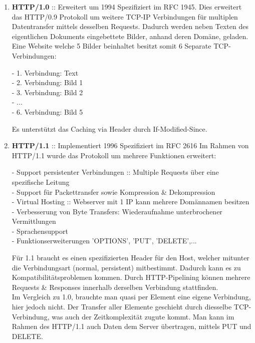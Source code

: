 \documentclass[11pt]{article}
\begin{document}
\begin{enumerate}[\thesection .1]
\begin{enumerate}[$\diamond$]
        \item \textbf{HTTP/1.0} :: Erweitert um 1994
        Spezifiziert im RFC 1945. Dies erweitert das HTTP/0.9 Protokoll um weitere TCP-IP Verbindungen für multiplen Datentransfer mittels desselben Requests.
        Dadurch werden neben Texten des eigentlichen Dokuments eingebettete Bilder, anhand deren Domäne, geladen.\\
        Eine Website welche 5 Bilder beinhaltet besitzt somit 6 Separate TCP-Verbindungen:
        \begin{addmargin}[1em]{1em}
            - 1. Verbindung: Text\\
            - 2. Verbindung: Bild 1\\
            - 3. Verbindung: Bild 2\\
            - ...\\
            - 6. Verbindung: Bild 5
        \end{addmargin}
        Es unterstützt das Caching via Header durch If-Modified-Since.\\

        \item \textbf{HTTP/1.1} :: Implementiert 1996
        Spezifiziert im RFC 2616
        Im Rahmen von HTTP/1.1 wurde das Protokoll um mehrere Funktionen erweitert:
        \begin{addmargin}[1em]{1em}
            - Support persistenter Verbindungen :: Multiple Requests über eine spezifische Leitung\\
            - Support für Packettransfer sowie Kompression \& Dekompression\\
            - Virtual Hosting :: Webserver mit 1 IP kann mehrere Domännamen besitzen\\
            - Verbesserung von Byte Transfers: Wiederaufnahme unterbrochener Vermittlungen\\
            - Sprachensupport\\
            - Funktionserweiterungen 'OPTIONS', 'PUT', 'DELETE',...
        \end{addmargin}
        Für 1.1 braucht es einen spezifizierten Header für den Host, welcher mitunter die Verbindungsart (normal, persistent) mitbestimmt.
        Dadurch kann es zu Kompatibilitätsproblemen kommen. Durch HTTP-Pipelining können mehrere Requests \& Responses innerhalb derselben Verbindung stattfinden.\\
        Im Vergleich zu 1.0, brauchte man quasi per Element eine eigene Verbindung, hier jedoch nicht. Der Transfer aller Elemente geschieht durch diesselbe TCP-Verbindung, was auch
        der Zeitkomplexität zugute kommt.
        Man kann im Rahmen des HTTP/1.1 auch Daten dem Server übertragen, mittels PUT und DELETE.\\


\end{enumerate}
\end{enumerate}
\end{document}
